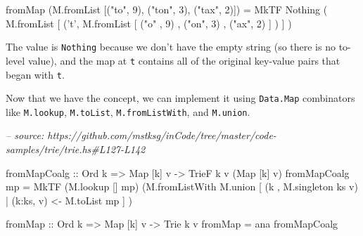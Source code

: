 \documentclass[]{article}
\newenvironment{Shaded}{}{}
\newcommand{\CharTok}[1]{\textcolor[rgb]{0.25,0.44,0.63}{#1}}
\newcommand{\CommentTok}[1]{\textcolor[rgb]{0.38,0.63,0.69}{\textit{#1}}}
\newcommand{\DataTypeTok}[1]{\textcolor[rgb]{0.56,0.13,0.00}{#1}}
\newcommand{\DecValTok}[1]{\textcolor[rgb]{0.25,0.63,0.44}{#1}}
\newcommand{\FunctionTok}[1]{\textcolor[rgb]{0.02,0.16,0.49}{#1}}
\newcommand{\NormalTok}[1]{#1}
\newcommand{\OtherTok}[1]{\textcolor[rgb]{0.00,0.44,0.13}{#1}}
\newcommand{\StringTok}[1]{\textcolor[rgb]{0.25,0.44,0.63}{#1}}
\begin{document}
\begin{Shaded}
\begin{Highlighting}[]
\NormalTok{fromMap (M.fromList [(}\StringTok{"to"}\NormalTok{, }\DecValTok{9}\NormalTok{), (}\StringTok{"ton"}\NormalTok{, }\DecValTok{3}\NormalTok{), (}\StringTok{"tax"}\NormalTok{, }\DecValTok{2}\NormalTok{)])}
    \FunctionTok{=} \DataTypeTok{MkTF} \DataTypeTok{Nothing}\NormalTok{ (}
\NormalTok{          M.fromList [}
\NormalTok{            (}\CharTok{'t'}\NormalTok{, M.fromList [}
\NormalTok{                (}\StringTok{"o"}\NormalTok{ , }\DecValTok{9}\NormalTok{)}
\NormalTok{              , (}\StringTok{"on"}\NormalTok{, }\DecValTok{3}\NormalTok{)}
\NormalTok{              , (}\StringTok{"ax"}\NormalTok{, }\DecValTok{2}\NormalTok{)}
\NormalTok{              ]}
\NormalTok{            )}
\NormalTok{          ]}
\NormalTok{        )}
\end{Highlighting}
\end{Shaded}

The value is \texttt{Nothing} because we don't have the empty string (so there
is no to-level value), and the map at \texttt{t} contains all of the original
key-value pairs that began with \texttt{t}.

Now that we have the concept, we can implement it using \texttt{Data.Map}
combinators like \texttt{M.lookup}, \texttt{M.toList}, \texttt{M.fromListWith},
and \texttt{M.union}.

\begin{Shaded}
\begin{Highlighting}[]
\CommentTok{-- source: https://github.com/mstksg/inCode/tree/master/code-samples/trie/trie.hs#L127-L142}

\NormalTok{fromMapCoalg}
\OtherTok{    ::} \DataTypeTok{Ord}\NormalTok{ k}
    \OtherTok{=>} \DataTypeTok{Map}\NormalTok{ [k] v}
    \OtherTok{->} \DataTypeTok{TrieF}\NormalTok{ k v (}\DataTypeTok{Map}\NormalTok{ [k] v)}
\NormalTok{fromMapCoalg mp }\FunctionTok{=} \DataTypeTok{MkTF}\NormalTok{ (M.lookup [] mp)}
\NormalTok{                       (M.fromListWith M.union}
\NormalTok{                          [ (k   , M.singleton ks v)}
                          \FunctionTok{|}\NormalTok{ (k}\FunctionTok{:}\NormalTok{ks, v) }\OtherTok{<-}\NormalTok{ M.toList mp}
\NormalTok{                          ]}
\NormalTok{                       )}

\NormalTok{fromMap}
\OtherTok{    ::} \DataTypeTok{Ord}\NormalTok{ k}
    \OtherTok{=>} \DataTypeTok{Map}\NormalTok{ [k] v}
    \OtherTok{->} \DataTypeTok{Trie}\NormalTok{ k v}
\NormalTok{fromMap }\FunctionTok{=}\NormalTok{ ana fromMapCoalg}
\end{Highlighting}
\end{Shaded}
\end{document}
